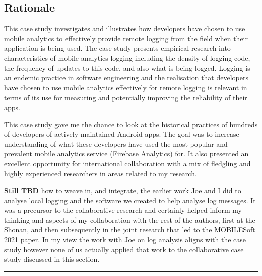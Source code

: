 
\subsection*{Rationale}

This case study investigates and illustrates how developers have chosen to use mobile analytics to effectively provide remote logging from the field when their application is being used. The case study presents empirical research into characteristics of mobile analytics logging including the density of logging code, the frequency of updates to this code, and also what is being logged. Logging is an endemic practice in software engineering and the realisation that developers have chosen to use mobile analytics effectively for remote logging is relevant in terms of its use for measuring and potentially improving the reliability of their apps.

This case study gave me the chance to look at the historical practices of hundreds of developers of actively maintained Android apps. The goal was to increase understanding of what these developers have used the most popular and prevalent mobile analytics service (Firebase Analytics) for. It also presented an excellent opportunity for international collaboration with a mix of fledgling and highly experienced researchers in areas related to my research.

\textbf{Still TBD} how to weave in, and integrate, the earlier work Joe and I did to analyse local logging and the software we created to help analyse log messages. It was a precursor to the collaborative research and certainly helped inform my thinking and aspects of my collaboration with the rest of the authors, first at the Shonan, and then subsequently in the joint research that led to the MOBILESoft 2021 paper. In my view the work with Joe on log analysis aligns with the case study however none of us actually applied that work to the collaborative case study discussed in this section.

\par\noindent\rule{\textwidth}{0.4pt}


